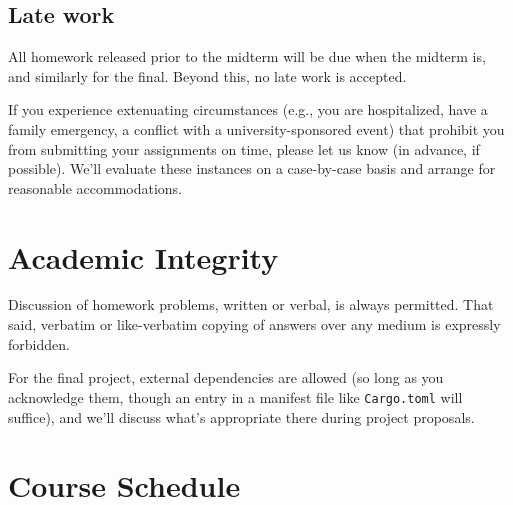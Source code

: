 \documentclass{article}
\begin{document}
\subsection*{Late work}

All homework released prior to the midterm will be due when the midterm is, and
similarly for the final. Beyond this, no late work is accepted.

If you experience extenuating circumstances (e.g., you are hospitalized, have a
family emergency, a conflict with a university-sponsored event) that prohibit
you from submitting your assignments on time, please let us know (in advance, if
possible). We'll evaluate these instances on a case-by-case basis and arrange
for reasonable accommodations.

\section*{Academic Integrity}

Discussion of homework problems, written or verbal, is always permitted. That
said, verbatim or like-verbatim copying of answers over any medium is expressly
forbidden.

For the final project, external dependencies are allowed (so long as you
acknowledge them, though an entry in a manifest file like \texttt{Cargo.toml}
will suffice), and we'll discuss what's appropriate there during project
proposals.

\section*{Course Schedule}
\end{document}
